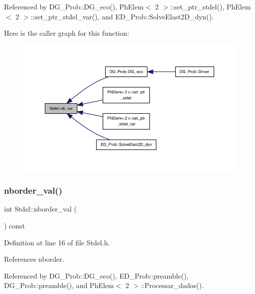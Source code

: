 Referenced by D\+G\+\_\+\+Prob\+::\+D\+G\+\_\+eco(), Ph\+Elem$<$ 2 $>$\+::set\+\_\+ptr\+\_\+stdel(), Ph\+Elem$<$ 2 $>$\+::set\+\_\+ptr\+\_\+stdel\+\_\+var(), and E\+D\+\_\+\+Prob\+::\+Solve\+Elast2\+D\+\_\+dyn().

Here is the caller graph for this function\+:
\nopagebreak
\begin{figure}[H]
\begin{center}
\leavevmode
\includegraphics[width=350pt]{classStdel_a4fb0a049dc27d8e67665a56d1b5a18ba_icgraph}
\end{center}
\end{figure}
\mbox{\label{classStdel_aac8e97661e46c48fafa91f13caa03a9f}} 
\subsubsection{\texorpdfstring{nborder\+\_\+val()}{nborder\_val()}}
{\footnotesize\ttfamily int Stdel\+::nborder\+\_\+val (\begin{DoxyParamCaption}{ }\end{DoxyParamCaption}) const\hspace{0.3cm}{\ttfamily [inline]}}



Definition at line 16 of file Stdel.\+h.



References nborder.



Referenced by D\+G\+\_\+\+Prob\+::\+D\+G\+\_\+eco(), E\+D\+\_\+\+Prob\+::preamble(), D\+G\+\_\+\+Prob\+::preamble(), and Ph\+Elem$<$ 2 $>$\+::\+Processar\+\_\+dados().

